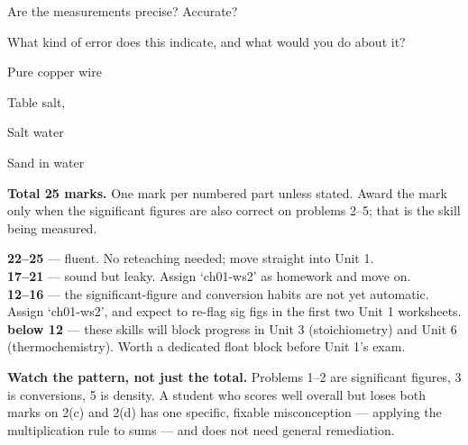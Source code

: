 \documentclass{apchem-worksheet}
\begin{document}
\begin{parts}
  \item Are the measurements precise? Accurate?
  \item What kind of error does this indicate, and what would you do about
        it? 
\end{parts}

\begin{parts}
  \item Pure copper wire 
  \item Table salt,  
  \item Salt water 
  \item Sand in water 
\end{parts}

\begin{apcnote}
\textbf{Total 25 marks.} One mark per numbered part unless stated.
Award the mark only when the significant figures are also correct on
problems 2--5; that is the skill being measured.

\medskip
\textbf{22--25} --- fluent. No reteaching needed; move straight into
Unit 1. \\
\textbf{17--21} --- sound but leaky. Assign `ch01-ws2' as homework and move
on. \\
\textbf{12--16} --- the significant-figure and conversion habits are not
yet automatic. Assign `ch01-ws2', and expect to re-flag sig figs in the
first two Unit 1 worksheets. \\
\textbf{below 12} --- these skills will block progress in Unit 3
(stoichiometry) and Unit 6 (thermochemistry). Worth a dedicated float block
before Unit 1's exam.

\medskip
\textbf{Watch the pattern, not just the total.} Problems 1--2 are
significant figures, 3 is conversions, 5 is density. A student who scores
well overall but loses both marks on 2(c) and 2(d) has one specific,
fixable misconception --- applying the multiplication rule to sums --- and
does not need general remediation.
\end{apcnote}
\end{document}
